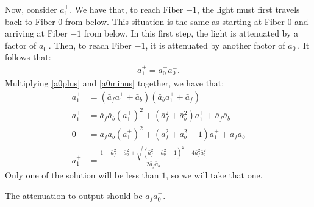 \documentclass[10pt]{article}
\begin{document}
  Now, consider $a_1^+$.  We have that, to reach Fiber $-1$, the light must first travels back to Fiber $0$ from below.  This situation is the same as starting at Fiber $0$ and arriving at Fiber $-1$ from below.  In this first step, the light is attenuated by a factor of $a_0^+$.  Then, to reach Fiber $-1$, it is attenuated by another factor of $a_0^-$.  It follows that:
  \begin{align*}
  	a_1^+ = a_0^+ a_0^-.
  \end{align*}
  Multiplying \eqref{a0plus} and \eqref{a0minus} together, we have that:
  \begin{align*}
  	a_1^+ &= (\bar{a}_f a_1^+ + \bar{a}_b)(\bar{a}_b a_1^+ + \bar{a}_f) \\
  	a_1^+ &= \bar{a}_f \bar{a}_b (a_1^+)^2 + (\bar{a}_f^2 + \bar{a}_b^2) a_1^+ + \bar{a}_f \bar{a}_b \\
  	0 &= \bar{a}_f \bar{a}_b (a_1^+)^2 + (\bar{a}_f^2 + \bar{a}_b^2 - 1) a_1^+ + \bar{a}_f \bar{a}_b \\
  	a_1^+ &= \frac{ 1 - \bar{a}_f^2 - \bar{a}_b^2 \pm \sqrt{ (\bar{a}_f^2 + \bar{a}_b^2 - 1)^2 - 4\bar{a}_f^2 \bar{a}_b^2 }}{2\bar{a}_f \bar{a}_b}
  \end{align*}
  Only one of the solution will be less than $1$, so we will take that one.

  The attenuation to output should be $\bar{a}_f a_0^+$.  

  
    
\end{document}
